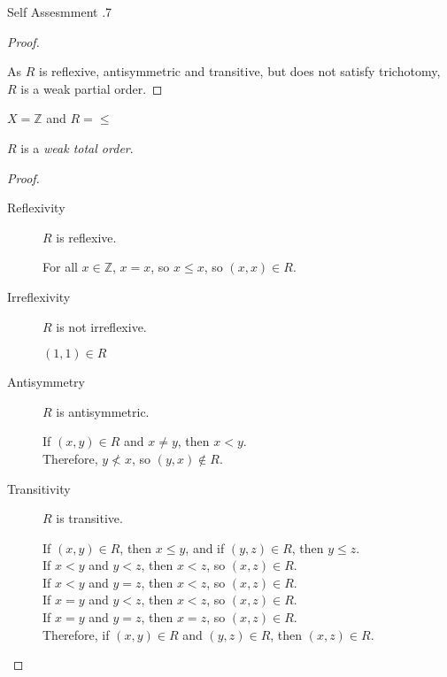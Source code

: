 \documentclass[\main/notes.tex]{subfiles}
\begin{document}
\begin{exercise}{Self Assesmment \thechapter.7}
\begin{questions}
\begin{questions}
\begin{answer}
\begin{proof}
\begin{description}
\begin{subproof}[Counterexample]
													\end{subproof}
											\end{description}
											As $R$ is reflexive, antisymmetric and transitive, but does not satisfy trichotomy, $R$ is a weak partial order.
										\end{proof}
									\end{answer}
							\end{questions}
						\item $X = \mathbb{Z}$ and $R = \leq$\\
							\begin{answer}
								$R$ is a \emph{weak total order}.
								\begin{proof}
									$ $
									\begin{description}
										\item[Reflexivity] $R$ is reflexive.
											\begin{subproof}
												For all $x \in \mathbb{Z}$, $x = x$, so $x \leq x$, so $(x, x) \in R$.
											\end{subproof}
										\item[Irreflexivity] $R$ is not irreflexive.
											\begin{subproof}[Counterexample]
												$(1, 1) \in R$
											\end{subproof}
										\item[Antisymmetry] $R$ is antisymmetric.
											\begin{subproof}
												If $(x, y) \in R$ and $x \neq y$, then $x < y$.\\
												Therefore, $y \not < x$, so $(y, x) \notin R$.
											\end{subproof}
										\pagebreak
										\item[Transitivity] $R$ is transitive.
											\begin{subproof}
												If $(x, y) \in R$, then $x \leq y$, and
												if $(y, z) \in R$, then $y \leq z$.\\
												If $x < y$ and $y < z$, then $x < z$, so $(x, z) \in R$.\\
												If $x < y$ and $y = z$, then $x < z$, so $(x, z) \in R$.\\
												If $x = y$ and $y < z$, then $x < z$, so $(x, z) \in R$.\\
												If $x = y$ and $y = z$, then $x = z$, so $(x, z) \in R$.\\
												Therefore, if $(x, y) \in R$ and $(y, z) \in R$, then $(x, z) \in R$. 

\end{subproof}
\end{description}
\end{proof}
\end{answer}
\end{questions}
\end{exercise}
\end{document}
